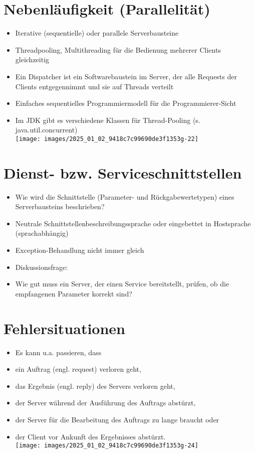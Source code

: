 \documentclass[10pt]{article}
\begin{document}
\section*{Nebenläufigkeit (Parallelität)}
\begin{itemize}
  \item Iterative (sequentielle) oder parallele Serverbausteine
  \item Threadpooling, Multithreading für die Bedienung mehrerer Clients gleichzeitig
  \item Ein Dispatcher ist ein Softwarebaustein im Server, der alle Requests der Clients entgegennimmt und sie auf Threads verteilt
  \item Einfaches sequentielles Programmiermodell für die Programmierer-Sicht
  \item Im JDK gibt es verschiedene Klassen für Thread-Pooling (s. java.util.concurrent)\\
\texttt{[image: images/2025\_01\_02\_9418c7c99690de3f1353g-22]}
\end{itemize}

\section*{Dienst- bzw. Serviceschnittstellen}
\begin{itemize}
  \item Wie wird die Schnittstelle (Parameter- und Rückgabewertetypen) eines Serverbausteins beschrieben?
  \item Neutrale Schnittstellenbeschreibungssprache oder eingebettet in Hostsprache (sprachabhängig)
  \item Exception-Behandlung nicht immer gleich
  \item Diskussionsfrage:
  \item Wie gut muss ein Server, der einen Service bereitstellt, prüfen, ob die empfangenen Parameter korrekt sind?
\end{itemize}

\section*{Fehlersituationen}
\begin{itemize}
  \item Es kann u.a. passieren, dass
  \item ein Auftrag (engl. request) verloren geht,
  \item das Ergebnis (engl. reply) des Servers verloren geht,
  \item der Server während der Ausführung des Auftrags abstürzt,
  \item der Server für die Bearbeitung des Auftrags zu lange braucht oder
  \item der Client vor Ankunft des Ergebnisses abstürzt.\\
\texttt{[image: images/2025\_01\_02\_9418c7c99690de3f1353g-24]}
\end{itemize}
\end{document}
